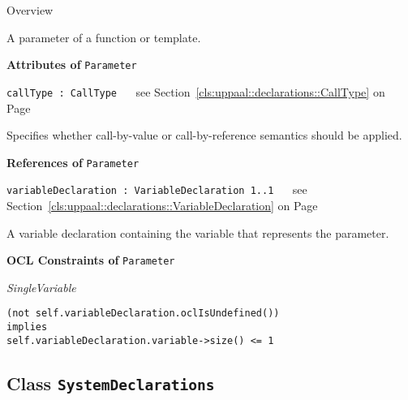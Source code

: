 	\begin{longdescription}
		\item[Overview] 		
				

	

		A parameter of a function or template.		
		
	
			\item[\textbf{Attributes of} \texttt{Parameter}] ~
			\begin{longdescription}
	\item[\texttt{callType : CallType 	}] ~
	see Section~\ref{cls:uppaal::declarations::CallType} on Page~\pageref{cls:uppaal::declarations::CallType}
	
	\nopagebreak
		
				

	

		Specifies whether call-by-value or call-by-reference semantics should be applied.		
			\end{longdescription}
			\item[\textbf{References of} \texttt{Parameter}] ~
			\begin{longdescription}
	\item[\texttt{variableDeclaration : VariableDeclaration 	\symbol{"5B}1..1\symbol{"5D}
}] ~
	see Section~\ref{cls:uppaal::declarations::VariableDeclaration} on Page~\pageref{cls:uppaal::declarations::VariableDeclaration}
	
	\nopagebreak
		
				

	

		A variable declaration containing the variable that represents the parameter.		
			\end{longdescription}
			\item[\textbf{OCL Constraints of} \texttt{Parameter}] ~
			\begin{longdescription}
	\item[\small\textit{SingleVariable}] ~ 
	\nopagebreak
	
		\begin{lstlisting}[breaklines=true]
(not self.variableDeclaration.oclIsUndefined())
implies
self.variableDeclaration.variable->size() <= 1		\end{lstlisting}
			\end{longdescription}
	
	\end{longdescription}
	

\subsection{Class \bfseries \texttt{SystemDeclarations}\normalfont}
\label{cls:uppaal::declarations::SystemDeclarations} 
	
